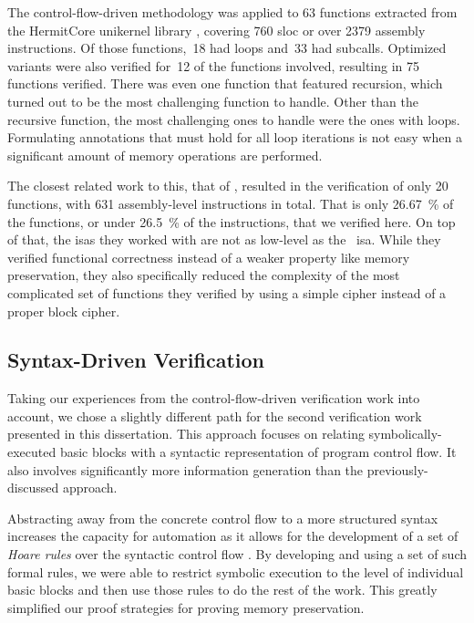 The control-flow-driven methodology was applied to \num{63} functions
extracted from the HermitCore  \autocite{lankes2016hermitcore}
unikernel library \autocite{madhavapeddy2014unikernels},
covering \num{760} \ac{sloc} or over \num{2379} assembly instructions.
Of those functions,~18 had loops and~33 had subcalls.
Optimized variants were also verified for~12 of the functions involved,
resulting in \num{75} functions verified.
There was even one function that featured recursion,
which turned out to be the most challenging function to handle.
Other than the recursive function, the most challenging ones to handle
were the ones with loops. Formulating annotations that must hold for all loop iterations
is not easy when a significant amount of memory operations are performed.

The closest related work to this, that of \textcite{matthews2006verification},
resulted in the verification of only \num{20} functions,
with \num{631} assembly-level instructions in total.
That is only \SI{26.67}{\percent} of the functions,
or under \SI{26.5}{\percent} of the instructions, that we verified here.
On top of that, the \acp{isa} they worked with are not as low-level as the \arch\ \ac{isa}.
While they verified functional correctness
instead of a weaker property like memory preservation,
they also specifically reduced the complexity
of the most complicated set of functions they verified
by using a simple  cipher instead of a proper block cipher.

\subsection{Syntax-Driven Verification}
Taking our experiences from the control-flow-driven verification work into account,
we chose a slightly different path for the second verification work
presented in this dissertation.
This approach focuses on relating symbolically-executed basic blocks
with a syntactic representation of program control flow.
It also involves significantly more information generation
than the previously-discussed approach.

Abstracting away from the concrete control flow to a more structured syntax
increases the capacity for automation
as it allows for the development of a set of \emph{Hoare rules}
over the syntactic control flow \autocite{hoare1969axiomatic}.
By developing and using a set of such formal rules, we were able to restrict symbolic execution
to the level of individual basic blocks and then use those rules to do the rest of the work.
This greatly simplified our proof strategies for proving memory preservation.

